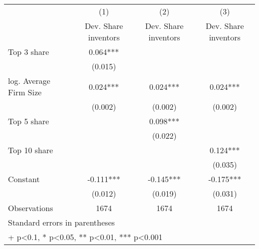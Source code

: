 {
\def\sym#1{\ifmmode^{#1}\else\(^{#1}\)\fi}
\begin{tabular}{l*{3}{c}}
\hline\hline
                    &\multicolumn{1}{c}{(1)}&\multicolumn{1}{c}{(2)}&\multicolumn{1}{c}{(3)}\\
                    &\multicolumn{1}{c}{Dev. Share inventors}&\multicolumn{1}{c}{Dev. Share inventors}&\multicolumn{1}{c}{Dev. Share inventors}\\
\hline
Top 3 share         &       0.064***&               &               \\
                    &     (0.015)   &               &               \\
[1em]
log. Average Firm Size&       0.024***&       0.024***&       0.024***\\
                    &     (0.002)   &     (0.002)   &     (0.002)   \\
[1em]
Top 5 share         &               &       0.098***&               \\
                    &               &     (0.022)   &               \\
[1em]
Top 10 share        &               &               &       0.124***\\
                    &               &               &     (0.035)   \\
[1em]
Constant            &      -0.111***&      -0.145***&      -0.175***\\
                    &     (0.012)   &     (0.019)   &     (0.031)   \\
\hline
Observations        &        1674   &        1674   &        1674   \\
\hline\hline
\multicolumn{4}{l}{\footnotesize Standard errors in parentheses}\\
\multicolumn{4}{l}{\footnotesize + p<0.1, * p<0.05, ** p<0.01, *** p<0.001}\\
\end{tabular}
}
